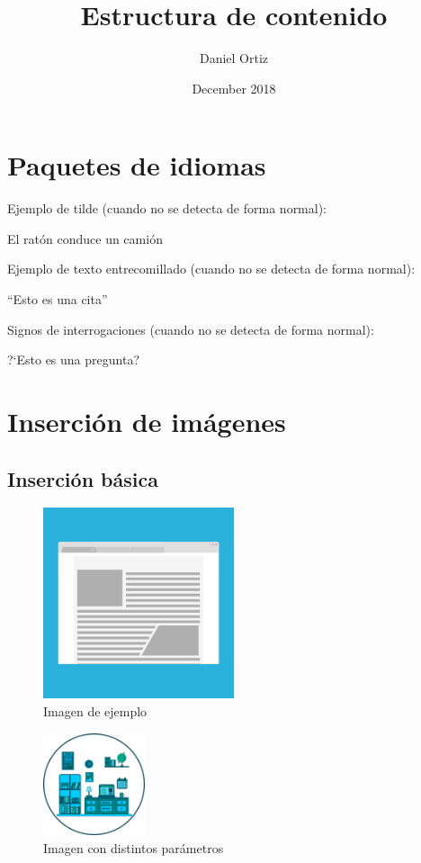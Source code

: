 \documentclass{article}
\title{Estructura de contenido}
\author{Daniel Ortiz}
\date{December 2018}
\begin{document}
\maketitle
\newpage
\tableofcontents
\newpage
\section{Paquetes de idiomas}
Ejemplo de tilde (cuando no se detecta de forma normal):
\begin{center}
    El rat\'on conduce un camión
\end{center}
Ejemplo de texto entrecomillado (cuando no se detecta de forma normal):
\begin{center}
     ``Esto es una cita''
\end{center}
Signos de interrogaciones (cuando no se detecta de forma normal):
\begin{center}
     ?`Esto es una pregunta?
\end{center}
\clearpage
\section{Inserción de imágenes}
\subsection{Inserción básica}
\begin{figure}[H] %
\centering \includegraphics[width=0.5\textwidth]{Images/image1.png} \caption{Imagen de ejemplo}
\end{figure}
\begin{figure}[h]
\raggedright \includegraphics[width=3cm]{Images/image2.png} 
\caption{Imagen con distintos parámetros}
\end{figure}
\end{document}
